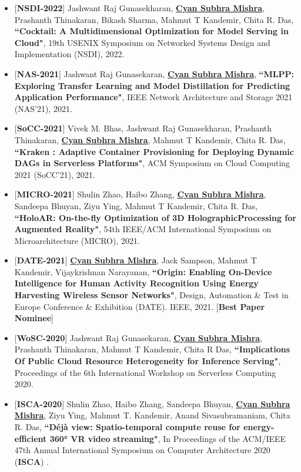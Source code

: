 \documentclass[letterpaper,11pt]{article}
\begin{document}
\begin{itemize}
\item \small{[\textbf{NSDI-2022}] Jashwant Raj Gunasekharan, \textbf{\underline{Cyan Subhra Mishra}}, Prashanth Thinakaran, Bikash Sharma, Mahmut T Kandemir, Chita R. Das, \textbf{``Cocktail: A Multidimensional Optimization for Model Serving in Cloud"}, 19th USENIX Symposium on Networked Systems Design and Implementation (NSDI), 2022.} 
    
\item \small{[\textbf{NAS-2021}] Jashwant Raj Gunasekaran, \textbf{\underline{Cyan Subhra Mishra}}, \textbf{``MLPP: Exploring Transfer Learning and Model Distillation for Predicting Application Performance"}, IEEE Network Architecture and Storage 2021 (NAS'21), 2021.}

\item \small{[\textbf{SoCC-2021}] Vivek M. Bhas, Jashwant Raj Gunasekharan, Prashanth Thinakaran, \textbf{\underline{Cyan Subhra Mishra}}, Mahmut T Kandemir, Chita R. Das, \textbf{``Kraken : Adaptive Container Provisioning for Deploying Dynamic DAGs in Serverless Platforms"}, ACM Symposium on Cloud Computing 2021 (SoCC'21), 2021.}
 
\item \small{[\textbf{MICRO-2021}] Shulin Zhao, Haibo Zhang, \textbf{\underline{Cyan Subhra Mishra}}, Sandeepa Bhuyan, Ziyu Ying, Mahmut T Kandemir, Chita R. Das, \textbf{``HoloAR: On-the-fly Optimization of 3D HolographicProcessing for Augmented Reality"}, 54th IEEE/ACM International Symposium on Microarchitecture (MICRO), 2021.}
   
    
\item \small{[\textbf{DATE-2021}] \textbf{\underline{Cyan Subhra Mishra}}, Jack Sampson, Mahmut T Kandemir, Vijaykrishnan Narayanan, \textbf{``Origin: Enabling On-Device Intelligence for Human Activity Recognition Using Energy Harvesting Wireless Sensor Networks"}, Design, Automation \& Test in Europe Conference \& Exhibition (DATE). IEEE, 2021. [\textbf{Best Paper Nominee}]}

\item \small{[\textbf{WoSC-2020}] Jashwant Raj Gunasekaran, \textbf{\underline{Cyan Subhra Mishra}}, Prashanth Thinakaran, Mahmut T Kandemir, Chita R Das, \textbf{``Implications Of Public Cloud Resource Heterogeneity for Inference Serving"}, Proceedings of the 6th International Workshop on Serverless Computing 2020.}
    
\item \small{[\textbf{ISCA-2020}] Shulin Zhao, Haibo Zhang, Sandeepa Bhuyan, \textbf{\underline{Cyan Subhra Mishra}}, Ziyu Ying, Mahmut T. Kandemir, Anand Sivasubramaniam, Chita R. Das, \textbf{``Déjà view: Spatio-temporal compute reuse for energy-efficient 360° VR video streaming"}, In Proceedings of the ACM/IEEE 47th Annual International Symposium on Computer Architecture 2020 (\textbf{ISCA}) .}
    

\end{itemize}
\end{document}
